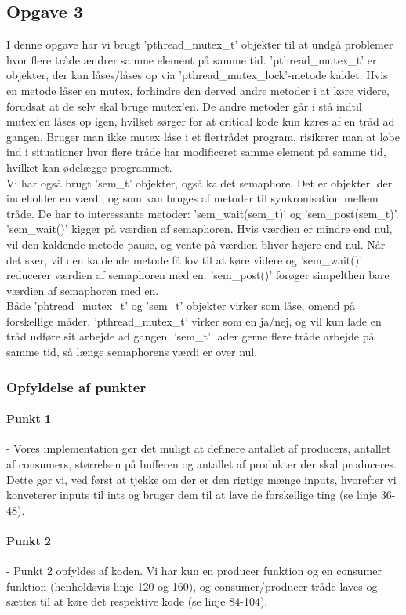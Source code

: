\subsection{Opgave 3}
\label{O3}
I denne opgave har vi brugt 'pthread_mutex_t' objekter til at undgå problemer hvor flere tråde ændrer samme element på samme tid. 'pthread_mutex_t' er objekter, der kan låses/låses op via 'pthread_mutex_lock'-metode kaldet. Hvis en metode låser en mutex, forhindre den derved andre metoder i at køre videre, forudsat at de selv skal bruge mutex'en. De andre metoder går i stå indtil mutex'en låses op igen, hvilket sørger for at critical kode kun køres af en tråd ad gangen. Bruger man ikke mutex låse i et flertrådet program, risikerer man at løbe ind i situationer hvor flere tråde har modificeret samme element på samme tid, hvilket kan ødelægge programmet.
\\ Vi har også brugt 'sem_t' objekter, også kaldet semaphore. Det er objekter, der indeholder en værdi, og som kan bruges af metoder til synkronisation mellem tråde. De har to interessante metoder: 'sem_wait(sem_t)' og 'sem_post(sem_t)'. 'sem_wait()' kigger på værdien af semaphoren. Hvis værdien er mindre end nul, vil den kaldende metode pause, og vente på værdien bliver højere end nul. Når det sker, vil den kaldende metode få lov til at køre videre og 'sem_wait()' reducerer værdien af semaphoren med en. 'sem_post()' forøger simpelthen bare værdien af semaphoren med en.
\\ Både 'phtread_mutex_t' og 'sem_t' objekter virker som låse, omend på forskellige måder. 'pthread_mutex_t' virker som en ja/nej, og vil kun lade en tråd udføre sit arbejde ad gangen. 'sem_t' lader gerne flere tråde arbejde på samme tid, så længe semaphorens værdi er over nul.

\subsubsection{Opfyldelse af punkter}
\label{O3_Punkter}
\paragraph{Punkt 1} - Vores implementation gør det muligt at definere antallet af producers, antallet af consumers, størrelsen på bufferen og antallet af produkter der skal produceres. Dette gør vi, ved først at tjekke om der er den rigtige mænge inputs, hvorefter vi konveterer inputs til ints og bruger dem til at lave de forskellige ting (se linje 36-48).
\paragraph{Punkt 2} - Punkt 2 opfyldes af koden. Vi har kun en producer funktion og en consumer funktion (henholdsvis linje 120 og 160), og consumer/producer tråde laves og sættes til at køre det respektive kode (se linje 84-104).
